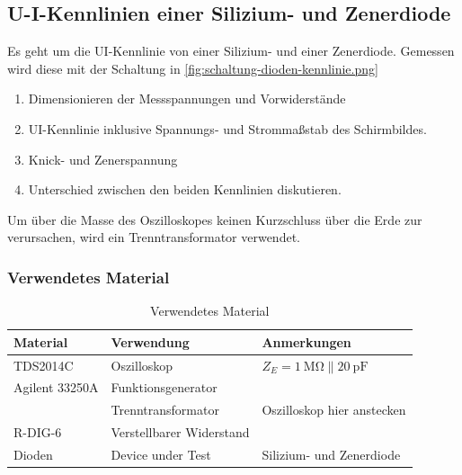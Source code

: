 \subsection{U-I-Kennlinien einer Silizium- und Zenerdiode}\label{sec:2-5}

\begin{highlightblock}
	Es geht um die UI-Kennlinie von einer Silizium- und einer Zenerdiode.
	Gemessen wird diese mit der Schaltung in
	\autoref{fig:schaltung-dioden-kennlinie.png}
	\begin{enumerate}[label=\textbf{\alph*:}, ref=\alph*, noitemsep]
		\item\label{itm:2-P5-1} Dimensionieren der Messspannungen und Vorwiderstände
		\item\label{itm:2-P5-2} UI-Kennlinie inklusive Spannungs- und Strommaßstab des Schirmbildes.
		\item\label{itm:2-P5-3}Knick- und Zenerspannung
		\item\label{itm:2-P5-4} Unterschied zwischen den beiden Kennlinien diskutieren.
	\end{enumerate}
	Um über die Masse des Oszilloskopes keinen Kurzschluss über die Erde zur
	verursachen, wird ein Trenntransformator verwendet.
\end{highlightblock}

\newpage
\subsubsection{Verwendetes Material}

\begin{table}[h]
	\centering
	\caption{Verwendetes Material}
	\begin{tabularx}{\textwidth}{XXX}
		\textbf{Material} & \textbf{Verwendung} & \textbf{Anmerkungen} \\ \midrule
		TDS2014C & Oszilloskop & $Z_E = \SI{1}{\mega\ohm}\parallel\SI{20}{\pico\farad}$ \\
		Agilent 33250A & Funktionsgenerator & \\
		& Trenntransformator & Oszilloskop hier anstecken \\
		R-DIG-6 & Verstellbarer Widerstand & \\
		Dioden & Device under Test & Silizium- und Zenerdiode\\
	\end{tabularx}
\end{table}
\vspace{-11pt}

